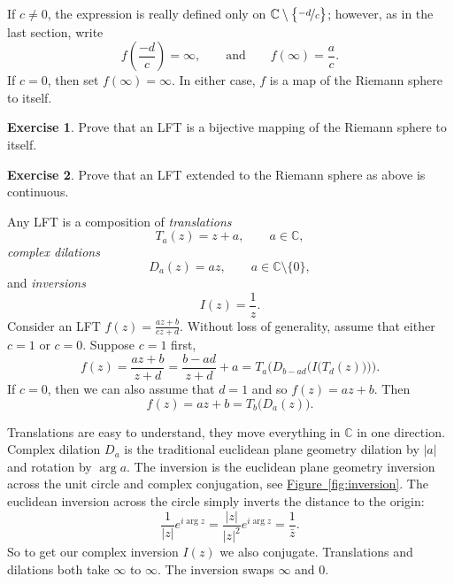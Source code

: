 \documentclass[12pt,openany]{book}
\newcommand{\sabs}[1]{\lvert {#1} \rvert}
\newcommand{\C}{{\mathbb{C}}}
\theoremstyle{plain}
\theoremstyle{remark}
\theoremstyle{definition}
\newenvironment{exbox}{%
    \def\FrameCommand{\vrule width 1pt \relax\hspace{10pt}}%
    \MakeFramed{\advance\hsize-\width\FrameRestore}%
}{%
    \endMakeFramed
}
\theoremstyle{exercise}
\newtheorem{exercise}{Exercise}[section]
\theoremstyle{example}
\newcommand{\figureref}[1]{\hyperref[#1]{Figure~\ref*{#1}}}
\begin{document}
If $c\not=0$,
the expression is really defined only on
$\C \setminus \bigl\{ \nicefrac{-d}{c} \bigr\}$;
however, as in the last section, write
\begin{equation*}
f\left(\frac{-d}{c}\right) = \infty, \qquad \text{and} \qquad
f(\infty) = \frac{a}{c} .
\end{equation*}
If $c=0$, then set $f(\infty) = \infty$.  In either case, $f$ is a map of
the Riemann sphere to itself.

\begin{exbox}
\begin{exercise}%
Prove that an LFT is a bijective mapping of the Riemann sphere to itself.
\end{exercise}

\begin{exercise}%
Prove that an LFT extended to the Riemann sphere as above is continuous.
\end{exercise}
\end{exbox}

Any LFT is a composition of \emph{translations}
\begin{equation*}
T_a(z) = z + a , \qquad a \in \C,
\end{equation*}
\emph{complex dilations}
\begin{equation*}
D_a(z) = az , \qquad a \in \C \setminus \{ 0 \} ,
\end{equation*}
and \emph{inversions}
\begin{equation*}
I(z) = \frac{1}{z}.
\end{equation*}
Consider an LFT $f(z) = \frac{az+b}{cz+d}$.
Without loss of generality, assume that either $c=1$ or $c=0$.
Suppose $c=1$ first,
\begin{equation*}
f(z)
=
\frac{a z + b}{z + d}
=
\frac{b-ad}{z+d}+a
=
T_a\biggr(D_{b-ad}\Bigr(I\bigl(T_d(z)\bigr)\Bigr)\biggr) .
\end{equation*}
If $c=0$, then we can also assume that $d=1$ and
so $f(z) = az + b$.
Then
\begin{equation*}
f(z) = az+b = T_b\bigl(D_a(z)\bigr) .
\end{equation*}

Translations are easy to understand, they move everything in $\C$ in one
direction.  Complex
dilation $D_a$ is the traditional euclidean plane geometry dilation by $\sabs{a}$
and rotation by $\arg a$.
The inversion is the euclidean plane geometry inversion
across the unit circle
and complex conjugation, see \figureref{fig:inversion}.  The euclidean
inversion across the circle simply inverts the distance to the origin:
\begin{equation*}
\frac{1}{\sabs{z}} e^{i \arg z} = 
\frac{\sabs{z}}{\sabs{z}^2} e^{i \arg z} = \frac{1}{\bar{z}} .
\end{equation*}
So to get our complex inversion $I(z)$ we also conjugate.
Translations and dilations both take $\infty$ to $\infty$.
The inversion swaps $\infty$ and $0$.
\end{document}
